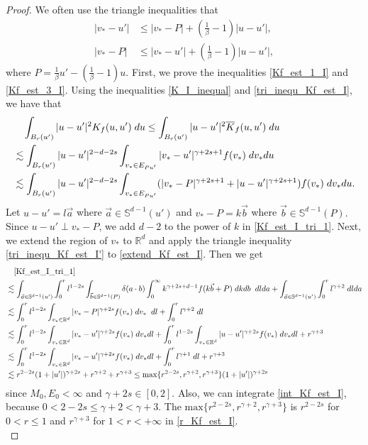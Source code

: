 \documentclass[reqno,10pt]{amsart}
\numberwithin{equation}{section}
\begin{document}
\begin{proof}
We often use the triangle inequalities that 
\begin{align} 
    |v_*-u'| &\leq |v_*-P|+(\frac{1}{\beta}-1)|u-u'|, \label{tri_inequ_Kf_est_I} \\
    |v_*-P| &\leq |v_*-u'|+(\frac{1}{\beta}-1)|u-u'|, \label{tri_inequ_Kf_est_I'} 
\end{align}
where $P=\frac{1}{\beta}u'-(\frac{1}{\beta}-1)u$.
First, we prove the inequalities \eqref{Kf_est_1_I} and \eqref{Kf_est_3_I}.
Using the inequalities \eqref{K_I_inequal} and \eqref{tri_inequ_Kf_est_I}, we have that
\begin{align}
&\quad\int_{B_{r}(u')}|u-u'|^2K_f(u,u')\; du \leq \int_{B_{r}(u')}|u-u'|^2\overline{K}_{f}(u,u')\; du \notag \\
&\lesssim
     \int_{B_{r}(u')}|u-u'|^{2-d-2s} \int_{v_*\in E_{Pu'}}|v_*-u'|^{\gamma+2s+1}f(v_*) \; dv_*du \notag \\
     &\lesssim
     \int_{B_{r}(u')}|u-u'|^{2-d-2s} \int_{v_*\in E_{Pu'}}(|v_*-P|^{\gamma+2s+1}+|u-u'|^{\gamma+2s+1})f(v_*) \; dv_*du. \label{Kf_est_I_tri_1}
\end{align}
Let $u-u'=l\vec{a}$ \;where $\vec{a} \in \mathbb{S}^{d-1}(u')$ and $v_*-P= k\vec{b}$ \;where $\vec{b} \in \mathbb{S}^{d-1}(P).$ Since $u-u'\;\bot\;v_*-P$, we add $d-2$ to the power of $k$ in \eqref{Kf_est_I_tri_1}. Next, we extend the region of $v_*$ to $\mathbb{R}^d$ and apply the triangle inequality \eqref{tri_inequ_Kf_est_I'} to  \eqref{extend_Kf_est_I}. Then we get
\begin{align}
      & \quad\eqref{Kf_est_I_tri_1} \notag \\ 
      &\lesssim \int_{\vec{a} \in \mathbb{S}^{d-1}(u')} \int_0^r l^{1-2s} \int_{\vec{b}\in \mathbb{S}^{d-1}(P)} \delta(a \cdot b)\int_0^{\infty} {k}^{\gamma+2s+d-1}f(k\vec{b}+P) \; dk db \;\; dlda +
      \int_{\vec{a} \in \mathbb{S}^{d-1}(u')}\int_0^r l^{\gamma+2} \; dlda  \notag \\
     &\lesssim  \int_0^r l^{1-2s} \int_{v_* \in \mathbb{R}^{d}} {|v_*-P|^{\gamma+2s}}f(v_*) \; dv_* \;\; dl +
     \int_0^r l^{\gamma+2} \;dl \label{extend_Kf_est_I} \\
     &\lesssim \int_0^r l^{1-2s} \int_{v_* \in \mathbb{R}^{d}} {|v_*-u'|^{\gamma+2s}}f(v_*) \; dv_*  dl + \int_0^r l^{1-2s} \int_{v_* \in \mathbb{R}^{d}} {|u-u'|^{\gamma+2s}}f(v_*) \; dv_* dl + r^{\gamma+3}  \notag\\
     & \lesssim \int_0^r l^{1-2s} \int_{v_* \in \mathbb{R}^{d}} {|v_*-u'|^{\gamma+2s}}f(v_*) \; dv_*  dl + \int_0^r l^{\gamma+1}\; dl + r^{\gamma+3} \label{int_Kf_est_I} \\ 
     &\lesssim r^{2-2s}(1+|u'|)^{\gamma+2s}+r^{\gamma+2}+r^{\gamma+3} \leq \text{max}\{r^{2-2s},r^{\gamma+2},r^{\gamma+3}\}(1+|u'|)^{\gamma+2s} \label{r_Kf_est_I}
\end{align} since $M_0, E_0 < \infty$ and $\gamma+2s \in [0,2].$ Also, we can integrate \eqref{int_Kf_est_I}, because $0<2-2s \leq \gamma+2<\gamma+3.$  
The $\text{max}\{r^{2-2s},r^{\gamma+2},r^{\gamma+3}\}$ is $r^{2-2s}$ for $0<r\leq 1$ and $r^{\gamma+3}$ for $1<r<+\infty$ in \eqref{r_Kf_est_I}. \\


\end{proof}
\end{document}
